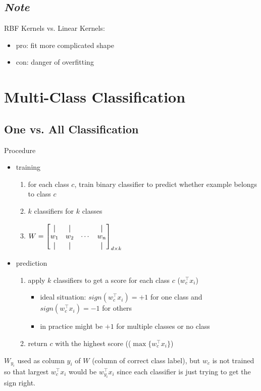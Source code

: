 \documentclass[10pt,landscape,a4paper]{article}
\newcommand*{\vertbar}{\rule[-1ex]{0.5pt}{2.5ex}}
\begin{document}
\begin{multicols*}{5}
\subsection{\emph{Note}}
RBF Kernels vs. Linear Kernels:
\begin{itemize}
    \item pro: fit more complicated shape
    \item con: danger of overfitting
\end{itemize}

\section{Multi-Class Classification}

\subsection{One vs. All Classification}
Procedure
\begin{itemize}
    \item training
    \begin{enumerate}
        \item for each class \(c\), train binary classifier to predict whether example belongs to class \(c\)
        \item \(k\) classifiers for \(k\) classes
        \item
        \(
            W =
            \begin{bmatrix}
                \vertbar & \vertbar & & \vertbar \\
                w_1 & w_2 & \cdots & w_n \\
                \vertbar & \vertbar & & \vertbar
            \end{bmatrix}_{d \times k}
        \)
    \end{enumerate}
    \item prediction
    \begin{enumerate}
        \item apply \(k\) classifiers to get a score for each class \(c\) (\(w_c^\intercal x_i\))
        \begin{itemize}
            \item ideal situation: \(sign(w_c^\intercal x_i) = +1\) for one class and \(sign(w_c^\intercal x_i) = -1\) for others
            \item in practice might be \(+1\) for multiple classes or no class
        \end{itemize}
        \item return \(c\) with the highest score ((\(\max\{w_c^\intercal x_i\}\))
    \end{enumerate}
\end{itemize}
\(W_{y_i}\) used as column \(y_i\) of \(W\) (column of correct class label), but \(w_c\) is not trained so that largest \(w_c^\intercal x_i\) would be \(w_{y_i}^\intercal x_i\) since each classifier is just trying to get the sign right.


\end{multicols*}
\end{document}
